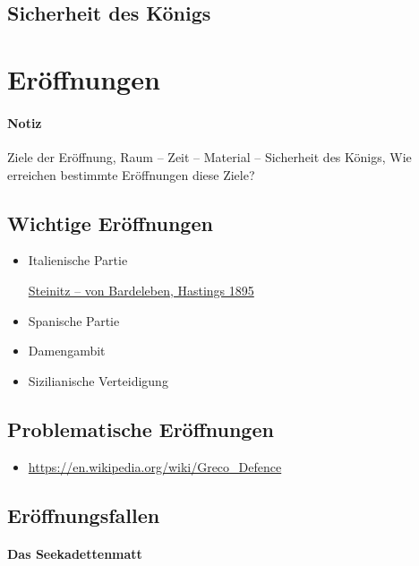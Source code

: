 \documentclass[
  a4paper,
  justified,
  nobib,
]{tufte-handout}
\newenvironment{notiz}{
  \color{Maroon}
  \paragraph*{Notiz}
}{
  \color{black}
}
\begin{document}
\subsection{Sicherheit des Königs}%
\label{sub:sicherheit_des_konigs}

\section{Eröffnungen}%
\label{sec:eroffnungen}

\begin{notiz}
  Ziele der Eröffnung, Raum – Zeit – Material – Sicherheit des Königs, Wie erreichen
  bestimmte Eröffnungen diese Ziele?
\end{notiz}

\subsection{Wichtige Eröffnungen}%
\label{sub:wichtige_eroffnungen}

\begin{itemize}
  \item Italienische Partie

    \href{https://de.wikipedia.org/wiki/Steinitz_–_von_Bardeleben,_Hastings_1895}{Steinitz
    – von Bardeleben, Hastings 1895}
  \item Spanische Partie
  \item Damengambit
  \item Sizilianische Verteidigung
\end{itemize}

\subsection{Problematische Eröffnungen}%
\label{sub:problematische_eroffnungen}

\begin{itemize}
  \item \url{https://en.wikipedia.org/wiki/Greco_Defence}
\end{itemize}

\subsection{Eröffnungsfallen}%
\label{sub:eroffnungsfallen}

\paragraph{Das Seekadettenmatt}%
\label{par:das_seekadettenmatt}
\end{document}
